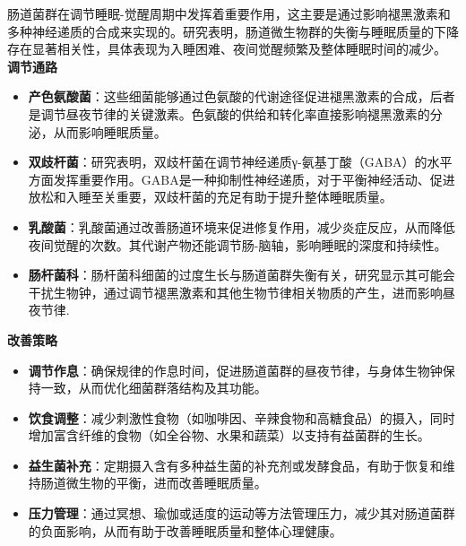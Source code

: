 \documentclass[UTF8]{ctexart}
\begin{document}
\begin{tcolorbox}[
    enhanced,
    colback=customTealBg,
    colframe=gray!3,
    arc=3mm,
    boxrule=0pt,
    width=\textwidth,
    top=8pt,
    bottom=8pt
]
{\small{\color{customTeal}\faInfoCircle}
肠道菌群在调节睡眠-觉醒周期中发挥着重要作用，这主要是通过影响褪黑激素和多种神经递质的合成来实现的。研究表明，肠道微生物群的失衡与睡眠质量的下降存在显著相关性，具体表现为入睡困难、夜间觉醒频繁及整体睡眠时间的减少。\\

\textbf{调节通路}
\begin{itemize}[]
    \item \textbf{产色氨酸菌}：这些细菌能够通过色氨酸的代谢途径促进褪黑激素的合成，后者是调节昼夜节律的关键激素。色氨酸的供给和转化率直接影响褪黑激素的分泌，从而影响睡眠质量。
    \item \textbf{双歧杆菌}：研究表明，双歧杆菌在调节神经递质γ-氨基丁酸（GABA）的水平方面发挥重要作用。GABA是一种抑制性神经递质，对于平衡神经活动、促进放松和入睡至关重要，双歧杆菌的充足有助于提升整体睡眠质量。
    \item \textbf{乳酸菌}：乳酸菌通过改善肠道环境来促进修复作用，减少炎症反应，从而降低夜间觉醒的次数。其代谢产物还能调节肠-脑轴，影响睡眠的深度和持续性。
    \item \textbf{肠杆菌科}：肠杆菌科细菌的过度生长与肠道菌群失衡有关，研究显示其可能会干扰生物钟，通过调节褪黑激素和其他生物节律相关物质的产生，进而影响昼夜节律.
\end{itemize}

\textbf{改善策略}
\begin{itemize}[]
    \item \textbf{调节作息}：确保规律的作息时间，促进肠道菌群的昼夜节律，与身体生物钟保持一致，从而优化细菌群落结构及其功能。
    \item \textbf{饮食调整}：减少刺激性食物（如咖啡因、辛辣食物和高糖食品）的摄入，同时增加富含纤维的食物（如全谷物、水果和蔬菜）以支持有益菌群的生长。
    \item \textbf{益生菌补充}：定期摄入含有多种益生菌的补充剂或发酵食品，有助于恢复和维持肠道微生物的平衡，进而改善睡眠质量。
    \item \textbf{压力管理}：通过冥想、瑜伽或适度的运动等方法管理压力，减少其对肠道菌群的负面影响，从而有助于改善睡眠质量和整体心理健康。
\end{itemize}
}
\end{tcolorbox}

\end{document}
